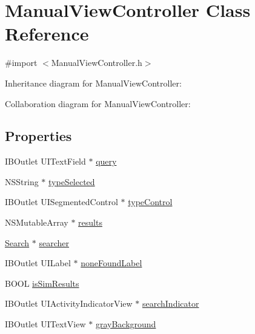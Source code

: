 \hypertarget{interface_manual_view_controller}{}\section{Manual\+View\+Controller Class Reference}
\label{interface_manual_view_controller}


{\ttfamily \#import $<$Manual\+View\+Controller.\+h$>$}



Inheritance diagram for Manual\+View\+Controller\+:


Collaboration diagram for Manual\+View\+Controller\+:
\subsection*{Properties}
\begin{DoxyCompactItemize}
\item 
I\+B\+Outlet U\+I\+Text\+Field $\ast$ \hyperlink{interface_manual_view_controller_ac25b8675461f6b134f294d9d000d9acb}{query}
\item 
N\+S\+String $\ast$ \hyperlink{interface_manual_view_controller_a62433952d153e6ec83ab6b5abe6e9355}{type\+Selected}
\item 
I\+B\+Outlet U\+I\+Segmented\+Control $\ast$ \hyperlink{interface_manual_view_controller_a3ed5cace841a47be8974104d6c12d708}{type\+Control}
\item 
N\+S\+Mutable\+Array $\ast$ \hyperlink{interface_manual_view_controller_ae31761f23bddb440bbc90bb863860457}{results}
\item 
\hyperlink{interface_search}{Search} $\ast$ \hyperlink{interface_manual_view_controller_a0941a4f7be19492af2df58b8cd677f1e}{searcher}
\item 
I\+B\+Outlet U\+I\+Label $\ast$ \hyperlink{interface_manual_view_controller_afb8fb2ba7d2fb64adaee3d7e184210f1}{none\+Found\+Label}
\item 
B\+O\+O\+L \hyperlink{interface_manual_view_controller_a20df493383dde01e934348e4ccb33090}{is\+Sim\+Results}
\item 
I\+B\+Outlet U\+I\+Activity\+Indicator\+View $\ast$ \hyperlink{interface_manual_view_controller_ab7d5ed6694032c058f36de73cbbfffe1}{search\+Indicator}
\item 
I\+B\+Outlet U\+I\+Text\+View $\ast$ \hyperlink{interface_manual_view_controller_adefbb904483341f811d5997aaa1adedc}{gray\+Background}
\end{DoxyCompactItemize}


